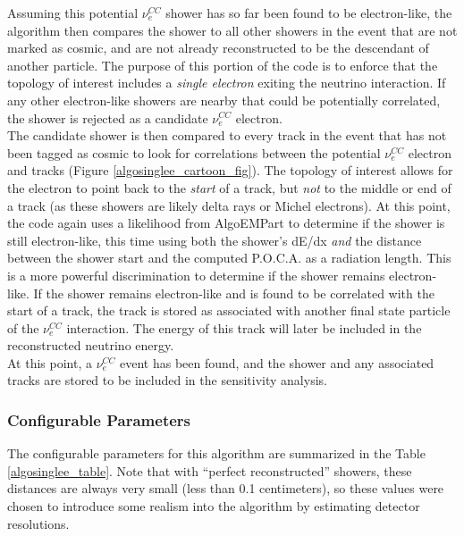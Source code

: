 Assuming this potential $\nu_e^{CC}$ shower has so far been found to be electron-like, the algorithm then compares the shower to all other showers in the event that are not marked as cosmic, and are not already reconstructed to be the descendant of another particle. The purpose of this portion of the code is to enforce that the topology of interest includes a \textit{single electron} exiting the neutrino interaction. If any other electron-like showers are nearby that could be potentially correlated, the shower is rejected as a candidate $\nu_e^{CC}$ electron.\\

The candidate shower is then compared to every track in the event that has not been tagged as cosmic to look for correlations between the potential $\nu_e^{CC}$ electron and tracks (Figure \ref{algosinglee_cartoon_fig}). The topology of interest allows for the electron to point back to the \textit{start} of a track, but \textit{not} to the middle or end of a track (as these showers are likely delta rays or Michel electrons). At this point, the code again uses a likelihood from AlgoEMPart to determine if the shower is still electron-like, this time using both the shower's dE/dx \textit{and} the distance between the shower start and the computed P.O.C.A. as a radiation length. This is a more powerful discrimination to determine if the shower remains electron-like. If the shower remains electron-like and is found to be correlated with the start of a track, the track is stored as associated with another final state particle of the $\nu_e^{CC}$ interaction. The energy of this track will later be included in the reconstructed neutrino energy.\\

At this point, a $\nu_e^{CC}$ event has been found, and the shower and any associated tracks are stored to be included in the sensitivity analysis.

\subsubsection{Configurable Parameters}
The configurable parameters for this algorithm are summarized in the Table \ref{algosinglee_table}. Note that with ``perfect reconstructed'' showers, these distances are always very small (less than 0.1 centimeters), so these values were chosen to introduce some realism into the algorithm by estimating detector resolutions.\\\\

